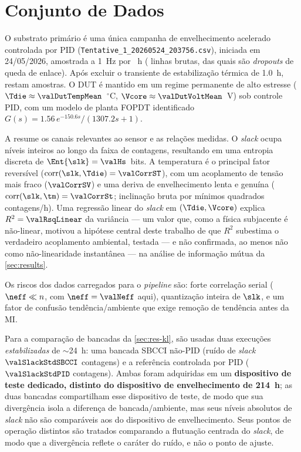 \section{Conjunto de Dados}
\label{sec:dataset}


O substrato primário é uma única campanha de envelhecimento acelerado
controlada por PID (\texttt{Tentative\_\allowbreak{}1\_\allowbreak{}20260524\_\allowbreak{}203756.csv}),
iniciada em 24/05/2026, amostrada a 1~Hz por \valDurationHours~h
(\valRawSamples{} linhas brutas, das quais \valDropouts{} são
\emph{dropouts} de queda de enlace). Após excluir o transiente de
estabilização térmica de 1.0~h, restam \valPostSoakSamples{} amostras. O DUT
é mantido em um regime permanente de alto estresse
($\Tdie\approx\valDutTempMean$~$^\circ$C, $\Vcore\approx\valDutVoltMean$~V)
sob controle PID, com um modelo de planta FOPDT identificado
$G(s)=1.56\,e^{-150.6 s}/(1307.2 s+1)$.

A  resume os canais relevantes ao sensor e as relações
medidas. O \emph{slack} ocupa \valSlackLevels{} níveis inteiros ao longo da
faixa de \valSlackRange{} contagens, resultando em uma entropia discreta de
$\Ent{\slk}=\valHs$~bits. A temperatura é o principal fator reversível
($\operatorname{corr}(\slk,\Tdie)=\valCorrST$), com um acoplamento de tensão
mais fraco ($\valCorrSV$) e uma deriva de envelhecimento lenta e genuína
($\operatorname{corr}(\slk,\tm)=\valCorrSt$; inclinação bruta por mínimos
quadrados \valSlopeRaw{} contagens/h). Uma regressão linear do \emph{slack}
em $(\Tdie,\Vcore)$ explica $R^2=\valRsqLinear$ da variância --- um valor
que, como a física subjacente é não-linear, motivou a hipótese central
deste trabalho de que $R^2$ subestima o verdadeiro acoplamento ambiental,
testada --- e não confirmada, ao menos não como não-linearidade
instantânea --- na análise de informação mútua da \cref{sec:results}.



Os riscos dos dados carregados para o \emph{pipeline} são: forte correlação
serial ($\neff\ll n$, com $\neff=\valNeff$ aqui), quantização inteira de
$\slk$, e um fator de confusão tendência/ambiente que exige remoção de
tendência antes da MI.

Para a comparação de bancadas da \cref{sec:res-kl}, são usadas duas
execuções \emph{estabilizadas} de $\sim$24~h: uma bancada SBCCI não-PID
(ruído de \emph{slack} $\valSlackStdSBCCI$ contagens) e a referência
controlada por PID ($\valSlackStdPID$ contagens). Ambas foram adquiridas em
um \textbf{dispositivo de teste dedicado, distinto do dispositivo de
envelhecimento de 214~h}; as duas bancadas compartilham esse dispositivo de
teste, de modo que sua divergência isola a diferença de bancada/ambiente,
mas seus níveis absolutos de \emph{slack} não são comparáveis aos do
dispositivo de envelhecimento. Seus pontos de operação distintos são
tratados comparando a flutuação centrada do \emph{slack}, de modo que a
divergência reflete o caráter do ruído, e não o ponto de ajuste.
